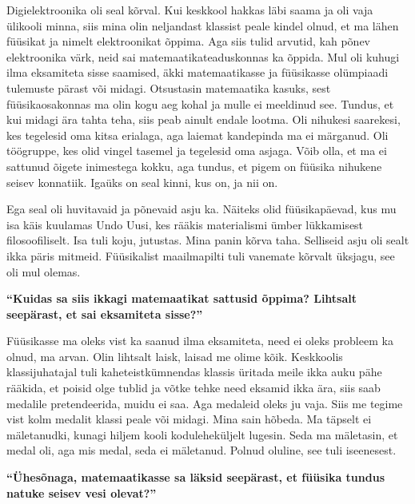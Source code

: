 Digielektroonika oli seal kõrval. Kui keskkool hakkas läbi saama ja oli vaja
ülikooli minna, siis mina olin neljandast klassist peale kindel olnud, et ma
lähen füüsikat ja nimelt elektroonikat õppima. Aga siis tulid arvutid, kah
põnev elektroonika värk, neid sai matemaatikateaduskonnas ka õppida. Mul oli
kuhugi ilma eksamiteta sisse saamised, äkki matemaatikasse ja füüsikasse
olümpiaadi tulemuste pärast või midagi. Otsustasin matemaatika kasuks, sest
füüsikaosakonnas ma olin kogu aeg kohal ja mulle ei meeldinud see. Tundus, et
kui midagi ära tahta teha, siis peab ainult endale lootma. Oli nihukesi
saarekesi, kes tegelesid oma kitsa erialaga, aga laiemat kandepinda ma ei
märganud. Oli töögruppe, kes olid vingel tasemel ja tegelesid oma asjaga. Võib
olla, et ma ei sattunud õigete inimestega kokku, aga tundus, et pigem on
füüsika nihukene seisev konnatiik. Igaüks on seal kinni, kus on, ja nii on.

Ega seal oli huvitavaid ja põnevaid asju ka. Näiteks olid füüsikapäevad, kus mu
isa käis kuulamas Undo Uusi, kes rääkis materialismi
ümber lükkamisest filosoofiliselt. Isa tuli koju, jutustas. Mina panin kõrva
taha. Selliseid asju oli sealt ikka päris mitmeid. Füüsikalist maailmapilti
tuli vanemate kõrvalt üksjagu, see oli mul olemas.

\textbf{\enquote{Kuidas sa siis ikkagi matemaatikat sattusid õppima? Lihtsalt
seepärast, et sai eksamiteta sisse?}}

Füüsikasse ma oleks vist ka saanud ilma eksamiteta, need ei oleks probleem ka
olnud, ma arvan. Olin lihtsalt laisk, laisad me olime kõik. Keskkoolis
klassijuhatajal tuli kaheteistkümnendas klassis üritada meile ikka auku pähe
rääkida, et poisid olge tublid ja võtke tehke need eksamid ikka ära, siis saab
medalile pretendeerida, muidu ei saa. Aga medaleid oleks ju vaja. Siis me
tegime vist kolm medalit klassi peale või midagi. Mina sain hõbeda. Ma täpselt
ei mäletanudki, kunagi hiljem kooli koduleheküljelt lugesin. Seda ma mäletasin,
et medal oli, aga mis medal, seda ei mäletanud. Polnud oluline, see tuli
iseenesest.

\textbf{\enquote{Ühesõnaga, matemaatikasse sa läksid seepärast, et füüsika
tundus natuke seisev vesi olevat?}}

